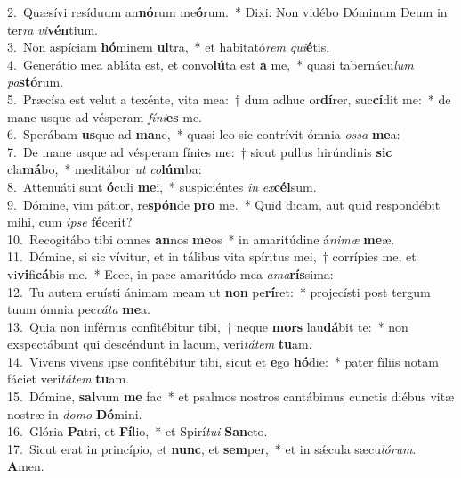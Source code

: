 {2.~}Quæsívi resíduum an\textbf{nó}rum me\textbf{ó}rum.~* Dixi: Non vidébo Dóminum Deum in ter\textit{ra} \textit{vi}\textbf{vén}tium.\\
{3.~}Non aspíciam \textbf{hó}minem \textbf{ul}tra,~* et habitató\textit{rem} \textit{qui}\textbf{é}tis.\\
{4.~}Generátio mea abláta est, et convo\textbf{lú}ta est \textbf{a} me,~* quasi tabernácu\textit{lum} \textit{pa}\textbf{stó}rum.\\
{5.~}Præcísa est velut a texénte, vita mea:~† dum adhuc or\textbf{dí}rer, suc\textbf{cí}dit me:~* de mane usque ad vésperam \textit{fí}\textit{ni}\textbf{es} me.\\
{6.~}Sperábam \textbf{us}que ad \textbf{ma}ne,~* quasi leo sic contrívit ómnia \textit{os}\textit{sa} \textbf{me}a:\\
{7.~}De mane usque ad vésperam fínies me:~† sicut pullus hirúndinis \textbf{sic} cla\textbf{má}bo,~* meditábor \textit{ut} \textit{co}\textbf{lúm}ba:\\
{8.~}Attenuáti sunt \textbf{ó}culi \textbf{me}i,~* suspiciéntes \textit{in} \textit{ex}\textbf{cél}sum.\\
{9.~}Dómine, vim pátior, re\textbf{spón}de \textbf{pro} me.~* Quid dicam, aut quid respondébit mihi, cum \textit{i}\textit{pse} \textbf{fé}cerit?\\
{10.~}Recogitábo tibi omnes \textbf{an}nos \textbf{me}os~* in amaritúdine á\textit{ni}\textit{mæ} \textbf{me}æ.\\
{11.~}Dómine, si sic vívitur, et in tálibus vita spíritus mei,~† corrípies me, et vi\textbf{vi}fi\textbf{cá}bis me.~* Ecce, in pace amaritúdo mea \textit{a}\textit{ma}\textbf{rís}sima:\\
{12.~}Tu autem eruísti ánimam meam ut \textbf{non} pe\textbf{rí}ret:~* projecísti post tergum tuum ómnia pec\textit{cá}\textit{ta} \textbf{me}a.\\
{13.~}Quia non inférnus confitébitur tibi,~† neque \textbf{mors} lau\textbf{dá}bit te:~* non exspectábunt qui descéndunt in lacum, veri\textit{tá}\textit{tem} \textbf{tu}am.\\
{14.~}Vivens vivens ipse confitébitur tibi, sicut et \textbf{e}go \textbf{hó}die:~* pater fíliis notam fáciet veri\textit{tá}\textit{tem} \textbf{tu}am.\\
{15.~}Dómine, \textbf{sal}vum \textbf{me} fac~* et psalmos nostros cantábimus cunctis diébus vitæ nostræ in \textit{do}\textit{mo} \textbf{Dó}mini.\\
{16.~}Glória \textbf{Pa}tri, et \textbf{Fí}lio,~* et Spirí\textit{tu}\textit{i} \textbf{San}cto.\\
{17.~}Sicut erat in princípio, et \textbf{nunc}, et \textbf{sem}per,~* et in sǽcula sæcu\textit{ló}\textit{rum}. \textbf{A}men.\\
